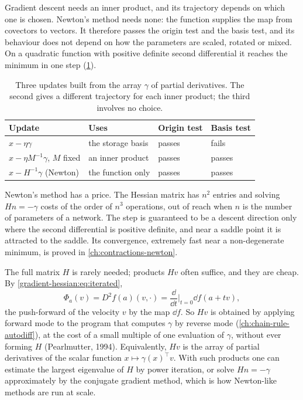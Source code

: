 \begin{notechapter}
\begin{keyidea}
Gradient descent needs an inner product, and its trajectory depends on
which one is chosen. Newton's method needs none: the function supplies
the map from covectors to vectors. It therefore passes the origin test
and the basis test, and its behaviour does not depend on how the
parameters are scaled, rotated or mixed. On a quadratic function with
positive definite second differential it reaches the minimum in one
step (\cref{gradient-hessian:tab:updates}).
\end{keyidea}

\begin{table}[ht]
\centering
\small
\begin{tabular}{@{}llll@{}}
\toprule
Update & Uses & Origin test & Basis test \\
\midrule
$x - \eta\gamma$ & the storage basis & passes & fails \\
$x - \eta M^{-1}\gamma$, $M$ fixed & an inner product & passes & passes \\
$x - H^{-1}\gamma$ (Newton) & the function only & passes & passes \\
\bottomrule
\end{tabular}
\caption{Three updates built from the array $\gamma$ of partial
derivatives. The second gives a different trajectory for each inner
product; the third involves no choice.}
\label{gradient-hessian:tab:updates}
\end{table}

Newton's method has a price. The Hessian matrix has $n^2$ entries and
solving $Hn = -\gamma$ costs of the order of $n^3$ operations, out of
reach when $n$ is the number of parameters of a network. The step is
guaranteed to be a descent direction only where the second differential
is positive definite, and near a saddle point it is attracted to the saddle. Its
convergence, extremely fast near a non-degenerate minimum, is proved in
\cref{ch:contractions-newton}.

\begin{mlthread}
The full matrix $H$ is rarely needed; products $Hv$ often suffice, and
they are cheap. By \eqref{gradient-hessian:eq:iterated},
\[
  \Phi_a(v) = D^2f(a)(v, \cdot)
  = \frac{\dd}{\dd t}\Big|_{t=0}\dd f(a + tv) ,
\]
the push-forward of the velocity $v$ by the map $\dd f$. So $Hv$ is
obtained by applying forward mode to the program that computes $\gamma$
by reverse mode (\cref{ch:chain-rule-autodiff}), at the cost of a small
multiple of one evaluation of $\gamma$, without ever forming $H$
(Pearlmutter, 1994). Equivalently, $Hv$ is the array of partial
derivatives of the scalar function $x\mapsto\gamma(x)^\top v$. With such
products one can estimate the largest eigenvalue of $H$ by power
iteration, or solve $Hn = -\gamma$ approximately by the conjugate
gradient method, which is how Newton-like methods are run at scale.
\end{mlthread}


\end{notechapter}
